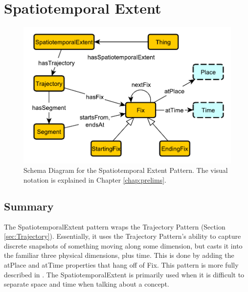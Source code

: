 \section{Spatiotemporal Extent}
\label{sec:Spatiotemporal}
\begin{figure}[h!]
\begin{center}
\includegraphics[width=.8\textwidth]{figures/ste}
\end{center}
\caption{Schema Diagram for the Spatiotemporal Extent Pattern. The visual notation is explained in Chapter \ref{chap:prelims}.}
\label{fig:Spatiotemporal}
\end{figure}
\subsection{Summary}
\label{sum:Spatiotemporal}
The \textsf{SpatiotemporalExtent} pattern wraps the \textsf{Trajectory} Pattern (Section \ref{sec:Trajectory}). Essentially, it uses the \textsf{Trajectory} Pattern's ability to capture discrete snapshots of something moving along some dimension, but casts it into the familiar three physical dimensions, plus time. This is done by adding the \textsf{atPlace} and \textsf{atTime} properties that hang off of \textsf{Fix}. This pattern is more fully described in \cite{ste}. The \textsf{SpatiotemporalExtent} is primarily used when it is difficult to separate space and time when talking about a concept.

